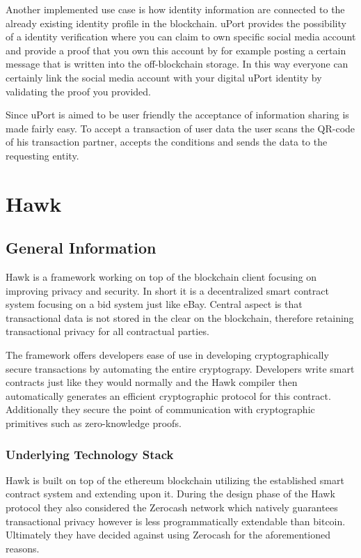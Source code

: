 Another implemented use case is how identity information are connected to the already existing identity profile in the blockchain. uPort provides the possibility of a identity verification where you can claim to own specific social media account and provide a proof that you own this account by  for example posting a certain message that is written into the off-blockchain storage. In this way everyone can certainly link the social media account with your digital uPort identity by validating the proof you provided.

Since uPort is aimed to be user friendly the acceptance of information sharing is made fairly easy. To accept a transaction of user data the user scans the QR-code of his transaction partner, accepts the conditions and sends the data to the requesting entity.

\section{Hawk}
\subsection{General Information}
Hawk is a framework working on top of the blockchain client focusing on improving privacy and security. In short it is a decentralized smart contract system focusing on a bid system just like eBay. Central aspect is that transactional data is not stored in the clear on the blockchain, therefore retaining transactional privacy for all contractual parties.

The framework offers developers ease of use in developing cryptographically secure transactions by automating the entire cryptograpy. Developers write smart contracts just like they would normally and the Hawk compiler then automatically generates an efficient cryptographic protocol for this contract. Additionally they secure the point of communication with cryptographic primitives such as zero-knowledge proofs.

\subsubsection{Underlying Technology Stack}
Hawk is built on top of the ethereum blockchain utilizing the established smart contract system and extending upon it. During the design phase of the Hawk protocol they also considered the Zerocash network which natively guarantees transactional privacy however is less programmatically extendable than bitcoin. Ultimately they have decided against using Zerocash for the aforementioned reasons.

